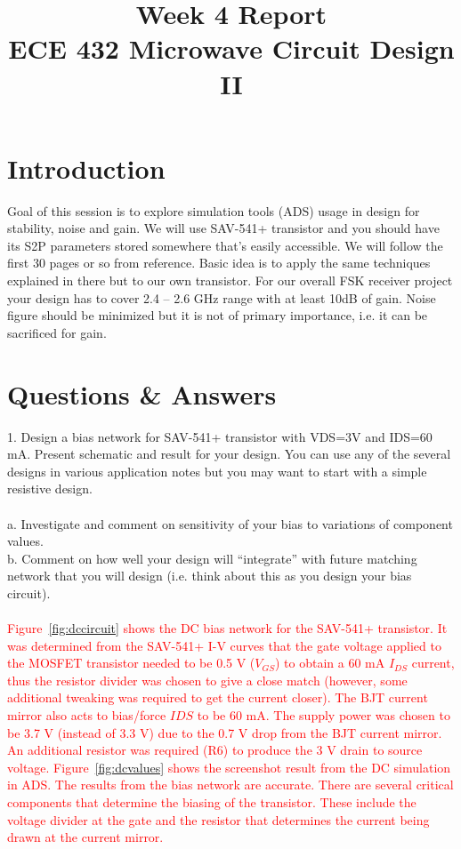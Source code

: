 \documentclass[conference]{IEEEtran}
\begin{document}
\title{Week 4 Report\\ECE 432 Microwave Circuit Design II}
\author{
}
\maketitle
\IEEEpeerreviewmaketitle
\section{Introduction}
Goal of this session is to explore simulation tools (ADS) usage in design for stability, noise and gain. We will use SAV-541+ transistor and you should have its S2P parameters stored somewhere that’s easily accessible. We will follow the first 30 pages or so from reference\cite{payne}. Basic idea is to apply the same techniques explained in there but to our own transistor. For our overall FSK receiver project your design has to cover 2.4 – 2.6 GHz range with at least 10dB of gain. Noise figure should be minimized but it is not of primary importance, i.e. it can be sacrificed for gain.
\section{Questions \& Answers}
1. Design a bias network for SAV-541+ transistor with VDS=3V and IDS=60 mA. Present schematic and result for your design. You can use any of the several designs in various application notes but you may want to start with a simple resistive design.\\\\
a. Investigate and comment on sensitivity of your bias to variations of component values.\\
b. Comment on how well your design will “integrate” with future matching network that you will design (i.e. think about this as you design your bias circuit).\\\\
\textcolor{red}{Figure~\ref{fig:dccircuit} shows the DC bias network for the SAV-541+ transistor.  It was determined from the SAV-541+ I-V curves that the gate voltage applied to the MOSFET transistor needed to be 0.5 V ($V_{GS}$) to obtain a 60 mA $I_{DS}$ current, thus the resistor divider was chosen to give a close match (however, some additional tweaking was required to get the current closer).   The BJT current mirror also acts to bias/force $I{DS}$ to be 60 mA.  The supply power was chosen to be 3.7 V (instead of 3.3 V) due to the 0.7 V drop from the BJT current mirror.  An additional resistor was required (R6) to produce the 3 V drain to source voltage.  Figure~\ref{fig:dcvalues} shows the screenshot result from the DC simulation in ADS.  The results from the bias network are accurate.  There are several critical components that determine the biasing of the transistor.  These include the voltage divider at the gate and the resistor that determines the current being drawn at the current mirror.}
\end{document}

